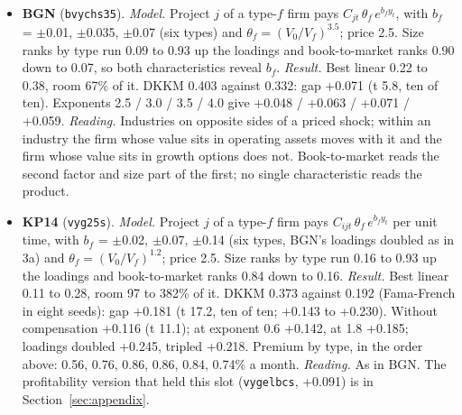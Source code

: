 \documentclass[11pt]{article}
\begin{document}
\begin{itemize}
\item \textbf{BGN} (\texttt{bvychs35}). \emph{Model.} Project $j$ of a type-$f$ firm pays $C_{jt}\,\theta_f\,e^{b_f y_t}$, with $b_f$ = $\pm$0.01, $\pm$0.035, $\pm$0.07 (six types) and $\theta_f = (V_0/V_f)^{3.5}$; price 2.5. Size ranks by type run 0.09 to 0.93 up the loadings and book-to-market ranks 0.90 down to 0.07, so both characteristics reveal $b_f$. \emph{Result.} Best linear 0.22 to 0.38, room 67\% of it. DKKM 0.403 against 0.332: gap +0.071 (t 5.8, ten of ten). Exponents 2.5 / 3.0 / 3.5 / 4.0 give +0.048 / +0.063 / +0.071 / +0.059. \emph{Reading.} Industries on opposite sides of a priced shock; within an industry the firm whose value sits in operating assets moves with it and the firm whose value sits in growth options does not. Book-to-market reads the second factor and size part of the first; no single characteristic reads the product.
\item \textbf{KP14} (\texttt{vyg25s}). \emph{Model.} Project $j$ of a type-$f$ firm pays $C_{ijt}\,\theta_f\,e^{b_f y_t}$ per unit time, with $b_f$ = $\pm$0.02, $\pm$0.07, $\pm$0.14 (six types, BGN's loadings doubled as in 3a) and $\theta_f = (V_0/V_f)^{1.2}$; price 2.5. Size ranks by type run 0.16 to 0.93 up the loadings and book-to-market ranks 0.84 down to 0.16. \emph{Result.} Best linear 0.11 to 0.28, room 97 to 382\% of it. DKKM 0.373 against 0.192 (Fama-French in eight seeds): gap +0.181 (t 17.2, ten of ten; +0.143 to +0.230). Without compensation +0.116 (t 11.1); at exponent 0.6 +0.142, at 1.8 +0.185; loadings doubled +0.245, tripled +0.218. Premium by type, in the order above: 0.56, 0.76, 0.86, 0.86, 0.84, 0.74\% a month. \emph{Reading.} As in BGN. The profitability version that held this slot (\texttt{vygelbcs}, +0.091) is in Section~\ref{sec:appendix}.

\end{itemize}
\end{document}
